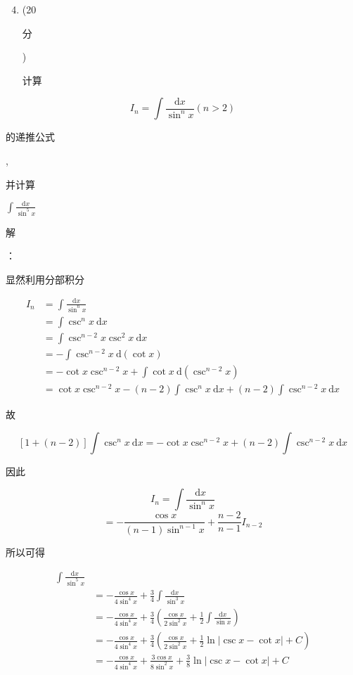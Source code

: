 \documentclass[10pt]{article}
\begin{document}
\begin{enumerate}
  \setcounter{enumi}{3}
  \item (20 \begin{CJK}{UTF8}{mj}分\end{CJK}) \begin{CJK}{UTF8}{mj}计算\end{CJK}
\end{enumerate}
$$
I_{n}=\int \frac{\mathrm{d} x}{\sin ^{n} x}(n>2)
$$
\begin{CJK}{UTF8}{mj}的递推公式\end{CJK}, \begin{CJK}{UTF8}{mj}并计算\end{CJK} $\int \frac{\mathrm{d} x}{\sin ^{5} x}$

\begin{CJK}{UTF8}{mj}解\end{CJK}：\begin{CJK}{UTF8}{mj}显然利用分部积分\end{CJK}
$$
\begin{aligned}
I_{n} &=\int \frac{\mathrm{d} x}{\sin ^{n} x} \\
&=\int \csc ^{n} x \mathrm{~d} x \\
&=\int \csc ^{n-2} x \csc ^{2} x \mathrm{~d} x \\
&=-\int \csc ^{n-2} x \mathrm{~d}(\cot x) \\
&=-\cot x \csc ^{n-2} x+\int \cot x \mathrm{~d}\left(\csc ^{n-2} x\right) \\
&=\cot x \csc ^{n-2} x-(n-2) \int \csc ^{n} x \mathrm{~d} x+(n-2) \int \csc ^{n-2} x \mathrm{~d} x
\end{aligned}
$$
\begin{CJK}{UTF8}{mj}故\end{CJK}
$$
[1+(n-2)] \int \csc ^{n} x \mathrm{~d} x=-\cot x \csc ^{n-2} x+(n-2) \int \csc ^{n-2} x \mathrm{~d} x
$$
\begin{CJK}{UTF8}{mj}因此\end{CJK}
$$
I_{n}=\int \frac{\mathrm{d} x}{\sin ^{n} x}
$$
$$
=-\frac{\cos x}{(n-1) \sin ^{n-1} x}+\frac{n-2}{n-1} I_{n-2}
$$
\begin{CJK}{UTF8}{mj}所以可得\end{CJK}
$$
\begin{aligned}
\int \frac{\mathrm{d} x}{\sin ^{5} x} \\
&=-\frac{\cos x}{4 \sin ^{4} x}+\frac{3}{4} \int \frac{\mathrm{d} x}{\sin ^{3} x} \\
&=-\frac{\cos x}{4 \sin ^{4} x}+\frac{3}{4}\left(\frac{\cos x}{2 \sin ^{2} x}+\frac{1}{2} \int \frac{\mathrm{d} x}{\sin x}\right) \\
&=-\frac{\cos x}{4 \sin ^{4} x}+\frac{3}{4}\left(\frac{\cos x}{2 \sin ^{2} x}+\frac{1}{2} \ln |\csc x-\cot x|+C\right) \\
&=-\frac{\cos x}{4 \sin ^{4} x}+\frac{3 \cos x}{8 \sin ^{2} x}+\frac{3}{8} \ln |\csc x-\cot x|+C
\end{aligned}
$$
\end{document}
